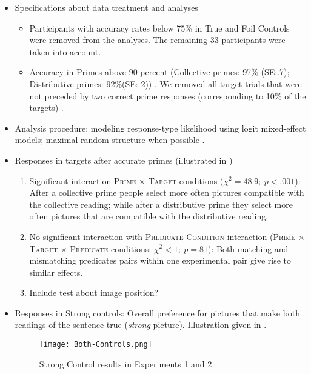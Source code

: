 \documentclass[a4paper]{article}
\newcommand{\nbMM}[1]{{\leavevmode\color{red}{\scriptsize#1}}}
\newcommand{\addMM}[1]{{\leavevmode\color{red}#1}}
\begin{document}
\begin{itemize}
\item Specifications about data treatment and analyses
\begin{itemize}

\item Participants with accuracy rates below 75\% in True and Foil Controls were removed from the analyses. The remaining 33 participants were taken into account. 

\item Accuracy in Primes above 90 percent (Collective primes: 97\% (SE:.7); Distributive primes: 92\%(SE: 2)) . We removed all target trials that were not preceded by two correct prime responses (corresponding to 10\% of the targets) . 

\end{itemize}

\item Analysis procedure: modeling response-type likelihood using logit mixed-effect models; maximal random structure when possible \nbMM{NB: only random intercepts per subject}.  

\item Responses in targets after accurate primes (illustrated in )

\begin{enumerate}

\item Significant interaction \textsc{Prime} $\times$ \textsc{Target} conditions ($\chi^{2}=48.9; \ p<.001$):
After a collective prime people select more often pictures compatible with the collective reading; while after a distributive prime they select more often pictures that are compatible with the distributive reading. 

\item No significant interaction with \textsc{Predicate Condition} interaction (\textsc{Prime} $\times$ \textsc{Target} $\times$ \textsc{Predicate} conditions: $\chi^{2}<1; \ p=81$): Both matching and mismatching predicates pairs within one experimental pair give rise to similar effects. 

\item \addMM{Include test about image position?}


\end{enumerate} 


\item Responses in Strong controls: Overall preference for pictures that make both readings of the sentence true (\emph{strong} picture). Illustration given in .

\begin{figure}[h!]
  \centering
      \texttt{[image: Both-Controls.png]}
         \caption{Strong Control results in Experiments 1 and 2}
        \label{fig:controls}
  \end{figure}



\end{itemize}
\end{document}
